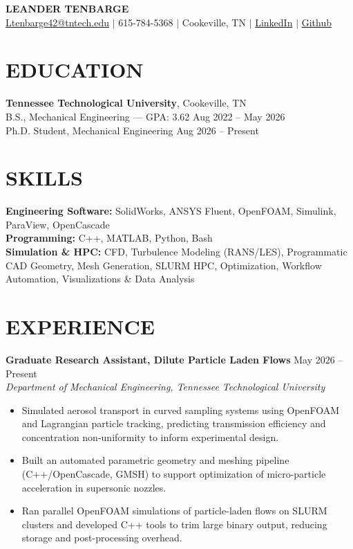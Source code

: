 \documentclass[12.0pt,letterpaper]{article}
\newcommand{\entryheader}[3]{%
    \textbf{#1} \hfill #2\\
    \textit{#3}
}
\begin{document}
\begin{center}
    {\LARGE\textbf{LEANDER TENBARGE}}\\[4pt]
    \href{mailto:Ltenbarge42@tntech.edu}{Ltenbarge42@tntech.edu} $\mid$
    615-784-5368 $\mid$
    Cookeville, TN $\mid$
    \href{https://www.linkedin.com/in/leandertenbarge/}{LinkedIn} $\mid$
    \href{https://github.com/LeanderTenbarge}{Github}
\end{center}
\vspace{15pt}

\section*{EDUCATION}
\textbf{Tennessee Technological University}, Cookeville, TN\\
B.S., Mechanical Engineering --- GPA: 3.62 \hfill Aug 2022 -- May 2026\\
Ph.D. Student, Mechanical Engineering \hfill Aug 2026 -- Present

\section*{SKILLS}
\textbf{Engineering Software:} SolidWorks, ANSYS Fluent, OpenFOAM, Simulink, ParaView, OpenCascade\\
\textbf{Programming:} C++, MATLAB, Python, Bash\\
\textbf{Simulation \& HPC:} CFD, Turbulence Modeling (RANS/LES), Programmatic CAD Geometry, Mesh Generation, SLURM HPC, Optimization, Workflow Automation, Visualizations \& Data Analysis

\section*{EXPERIENCE}

\entryheader{Graduate Research Assistant, Dilute Particle Laden Flows}{May 2026 -- Present}{Department of Mechanical Engineering, Tennessee Technological University}
\vspace{4pt}
\begin{itemize}
\item Simulated aerosol transport in curved sampling systems using OpenFOAM and Lagrangian particle tracking, predicting transmission efficiency and concentration non-uniformity to inform experimental design.
\item Built an automated parametric geometry and meshing pipeline (C++/OpenCascade, GMSH) to support optimization of micro-particle acceleration in supersonic nozzles.
\item Ran parallel OpenFOAM simulations of particle-laden flows on SLURM clusters and developed C++ tools to trim large binary output, reducing storage and post-processing overhead.
\end{itemize}
\vspace{15pt}
\end{document}

